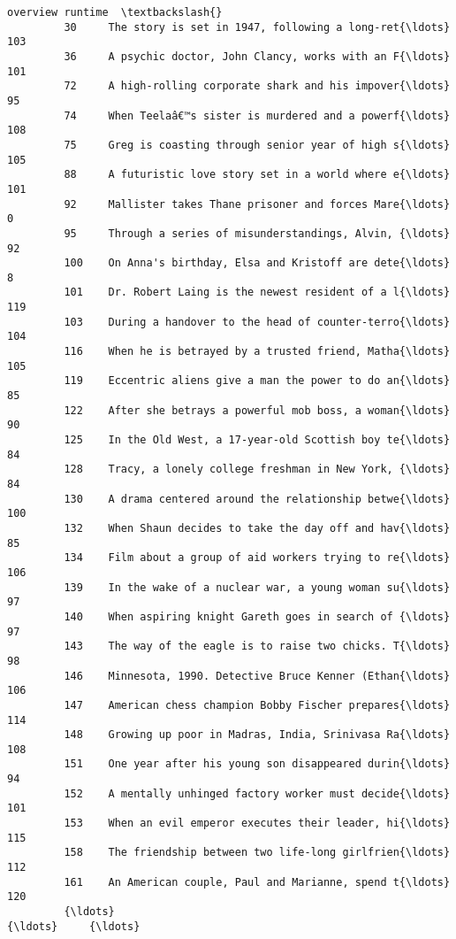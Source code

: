 \documentclass[11pt]{article}
\begin{document}
\begin{Verbatim}[commandchars=\\\{\}]
                                                         overview runtime  \textbackslash{}
         30     The story is set in 1947, following a long-ret{\ldots}     103   
         36     A psychic doctor, John Clancy, works with an F{\ldots}     101   
         72     A high-rolling corporate shark and his impover{\ldots}      95   
         74     When Teelaâ€™s sister is murdered and a powerf{\ldots}     108   
         75     Greg is coasting through senior year of high s{\ldots}     105   
         88     A futuristic love story set in a world where e{\ldots}     101   
         92     Mallister takes Thane prisoner and forces Mare{\ldots}       0   
         95     Through a series of misunderstandings, Alvin, {\ldots}      92   
         100    On Anna's birthday, Elsa and Kristoff are dete{\ldots}       8   
         101    Dr. Robert Laing is the newest resident of a l{\ldots}     119   
         103    During a handover to the head of counter-terro{\ldots}     104   
         116    When he is betrayed by a trusted friend, Matha{\ldots}     105   
         119    Eccentric aliens give a man the power to do an{\ldots}      85   
         122    After she betrays a powerful mob boss, a woman{\ldots}      90   
         125    In the Old West, a 17-year-old Scottish boy te{\ldots}      84   
         128    Tracy, a lonely college freshman in New York, {\ldots}      84   
         130    A drama centered around the relationship betwe{\ldots}     100   
         132    When Shaun decides to take the day off and hav{\ldots}      85   
         134    Film about a group of aid workers trying to re{\ldots}     106   
         139    In the wake of a nuclear war, a young woman su{\ldots}      97   
         140    When aspiring knight Gareth goes in search of {\ldots}      97   
         143    The way of the eagle is to raise two chicks. T{\ldots}      98   
         146    Minnesota, 1990. Detective Bruce Kenner (Ethan{\ldots}     106   
         147    American chess champion Bobby Fischer prepares{\ldots}     114   
         148    Growing up poor in Madras, India, Srinivasa Ra{\ldots}     108   
         151    One year after his young son disappeared durin{\ldots}      94   
         152    A mentally unhinged factory worker must decide{\ldots}     101   
         153    When an evil emperor executes their leader, hi{\ldots}     115   
         158    The friendship between two life-long girlfrien{\ldots}     112   
         161    An American couple, Paul and Marianne, spend t{\ldots}     120   
         {\ldots}                                                  {\ldots}     {\ldots}   

\end{Verbatim}
\end{document}
